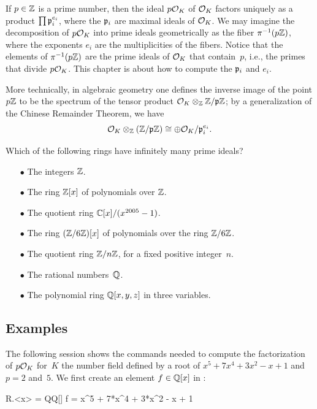 If $p\in\mathbb{Z}$ is a prime number, then the ideal $p\mathcal{O}_K$ of $\mathcal{O}_K$
factors uniquely as a product $\prod \mathfrak{p}_i^{e_i}$, where the $\mathfrak{p}_i$ are
maximal ideals of $\mathcal{O}_K$.  We may imagine the decomposition of $p\mathcal{O}_K$
into prime ideals geometrically as the fiber $\pi^{-1}(p\mathbb{Z})$, where
the exponents $e_i$ are the multiplicities of the fibers.  Notice that
the elements of $\pi^{-1}(p\mathbb{Z})$ are the prime ideals of $\mathcal{O}_K$ that
contain~$p$, i.e., the primes that divide $p\mathcal{O}_K$.
This chapter is about how to compute the $\mathfrak{p}_i$ and $e_i$.

\begin{remark}
  More technically, in algebraic geometry one defines the inverse
  image of the point $p\mathbb{Z}$ to be the spectrum of the tensor product
  $\mathcal{O}_K \otimes_{\mathbb{Z}} \mathbb{Z}/\mathfrak{p}\mathbb{Z}$; by a generalization of the Chinese
  Remainder Theorem, we have
$$
  \mathcal{O}_K \otimes_{\mathbb{Z}} \left(\mathbb{Z}/\mathfrak{p}\mathbb{Z}\right) \cong \oplus \mathcal{O}_K/\mathfrak{p}_i^{e_i}.
$$
\end{remark}

\begin{exercise}
  Which of the following rings have infinitely
  many prime ideals?
  \begin{multicols}{2}
  \begin{enumerate}
    \item[$\bullet$] The integers $\mathbb{Z}$.
    \item[$\bullet$] The ring $\mathbb{Z}[x]$ of polynomials over $\mathbb{Z}$.
    \item[$\bullet$] The quotient ring $\mathbb{C}[x]/(x^{2005}-1)$.
    \item[$\bullet$] The ring $(\mathbb{Z}/6\mathbb{Z})[x]$ of polynomials over the ring $\mathbb{Z}/6\mathbb{Z}$.
    \item[$\bullet$] The quotient ring $\mathbb{Z}/n\mathbb{Z}$, for a fixed positive integer~$n$.
    \item[$\bullet$] The rational numbers~$\mathbb{Q}$.
    \item[$\bullet$] The polynomial ring $\mathbb{Q}[x,y,z]$ in three variables.
  \end{enumerate}
  \end{multicols}
\end{exercise}

\subsection{Examples}
The following \sage session shows the commands needed to compute
the factorization of $p\mathcal{O}_K$ for~$K$ the number field
defined by a root of $x^5+7x^4+3x^2-x+1$ and $p=2$ and~$5$.
We first create an element $f\in \mathbb{Q}[x]$ in \sage:
\begin{sagecode}
\begin{sagecell}
R.<x> = QQ[]
f = x^5 + 7*x^4 + 3*x^2 - x + 1
\end{sagecell}
\end{sagecode} %


